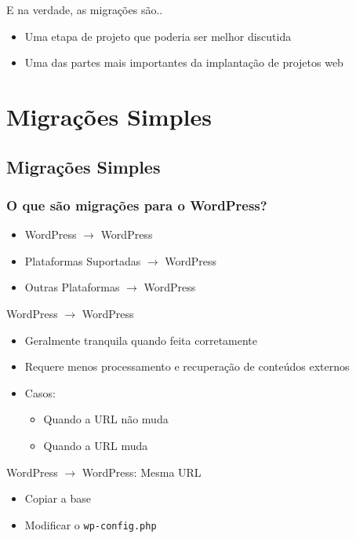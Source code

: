 \documentclass[handout]{beamer}
\begin{document}
\begin{frame}{E na verdade, as migrações são..}
\begin{itemize}
  \pause \item Uma etapa de projeto que poderia ser melhor discutida
  \pause \item Uma das partes mais importantes da implantação de projetos web
\end{itemize}
\end{frame}

\section{Migrações Simples}
\subsection{Migrações Simples}

\begin{frame}
\frametitle{O que são migrações para o WordPress?}
\begin{itemize}
  \pause \item WordPress $\rightarrow$ WordPress
  \pause \item Plataformas Suportadas $\rightarrow$ WordPress
  \pause \item Outras Plataformas $\rightarrow$ WordPress
\end{itemize}
\end{frame}

\begin{frame}{WordPress $\rightarrow$ WordPress}
\begin{itemize}
  \pause \item Geralmente tranquila quando feita corretamente
  \pause \item Requere menos processamento e recuperação de conteúdos
               externos
  \pause \item Casos:
    \begin{itemize}
      \pause \item Quando a URL não muda
      \pause \item Quando a URL muda
    \end{itemize}
\end{itemize}
\end{frame}

\begin{frame}{WordPress $\rightarrow$ WordPress: Mesma URL}
\begin{itemize}
  \pause \item Copiar a base
  \pause \item Modificar o \texttt{wp-config.php}
\end{itemize}
\end{frame}
\end{document}
